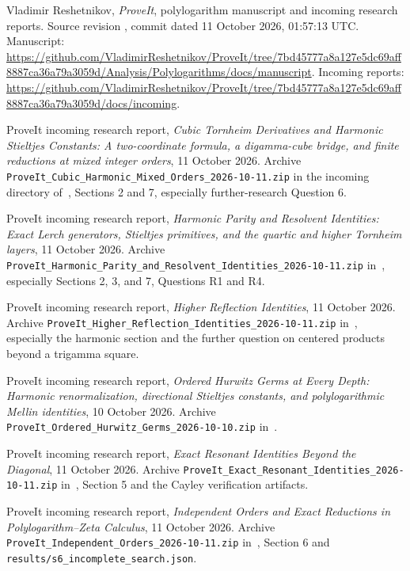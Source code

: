 Vladimir Reshetnikov, \emph{ProveIt}, polylogarithm manuscript and
incoming research reports. Source revision
\snapshot, commit dated 11 October 2026, 01:57:13 UTC.
Manuscript:
\url{https://github.com/VladimirReshetnikov/ProveIt/tree/7bd45777a8a127e5dc69aff8887ca36a79a3059d/Analysis/Polylogarithms/docs/manuscript}.
Incoming reports:
\url{https://github.com/VladimirReshetnikov/ProveIt/tree/7bd45777a8a127e5dc69aff8887ca36a79a3059d/docs/incoming}.

ProveIt incoming research report,
\emph{Cubic Tornheim Derivatives and Harmonic Stieltjes Constants:
A two-coordinate formula, a digamma-cube bridge, and finite reductions
at mixed integer orders}, 11 October 2026.
Archive \nolinkurl{ProveIt_Cubic_Harmonic_Mixed_Orders_2026-10-11.zip}
in the incoming directory of~\cite{ProveIt}, Sections 2 and 7,
especially further-research Question 6.

ProveIt incoming research report,
\emph{Harmonic Parity and Resolvent Identities:
Exact Lerch generators, Stieltjes primitives, and the quartic and higher
Tornheim layers}, 11 October 2026.
Archive
\nolinkurl{ProveIt_Harmonic_Parity_and_Resolvent_Identities_2026-10-11.zip}
in~\cite{ProveIt}, especially Sections 2, 3, and 7, Questions R1 and R4.

ProveIt incoming research report,
\emph{Higher Reflection Identities}, 11 October 2026.
Archive \nolinkurl{ProveIt_Higher_Reflection_Identities_2026-10-11.zip}
in~\cite{ProveIt}, especially the harmonic section and the further
question on centered products beyond a trigamma square.

ProveIt incoming research report,
\emph{Ordered Hurwitz Germs at Every Depth:
Harmonic renormalization, directional Stieltjes constants, and
polylogarithmic Mellin identities}, 10 October 2026.
Archive \nolinkurl{ProveIt_Ordered_Hurwitz_Germs_2026-10-10.zip}
in~\cite{ProveIt}.

ProveIt incoming research report,
\emph{Exact Resonant Identities Beyond the Diagonal},
11 October 2026.
Archive \nolinkurl{ProveIt_Exact_Resonant_Identities_2026-10-11.zip}
in~\cite{ProveIt}, Section 5 and the Cayley verification artifacts.

ProveIt incoming research report,
\emph{Independent Orders and Exact Reductions in
Polylogarithm--Zeta Calculus}, 11 October 2026.
Archive \nolinkurl{ProveIt_Independent_Orders_2026-10-11.zip}
in~\cite{ProveIt}, Section 6 and
\nolinkurl{results/s6_incomplete_search.json}.

